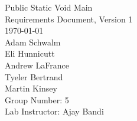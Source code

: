 \begin{titlepage}
\begin{center}

\vspace*{3.0 cm}
{\Huge Public Static Void Main}\\[0.7cm]
{\Large Requirements Document, Version 1}\\[3.8cm]
{\Large \today}\\[0.5cm]
Adam Schwalm\\
Eli Hunnicutt\\
Andrew LaFrance\\
Tyeler Bertrand\\
Martin Kinsey\\[4.0cm]

Group Number: 5\\
Lab Instructor: Ajay Bandi
  

  
\end{center}
\end{titlepage}
